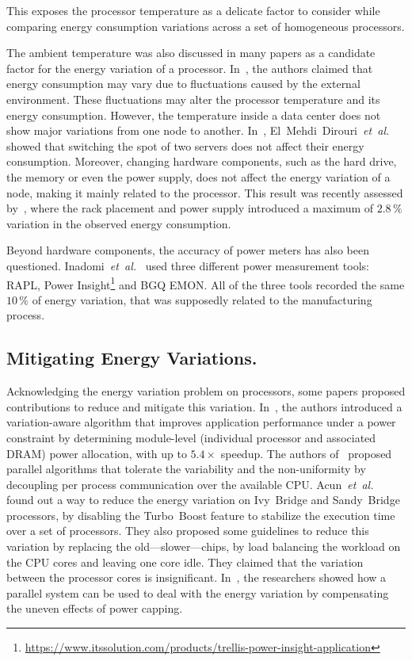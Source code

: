 
This exposes the processor temperature as a delicate factor to consider while comparing energy consumption variations across a set of homogeneous processors.%

The ambient temperature was also discussed in many papers as a candidate factor for the energy variation of a processor.
In~\cite{ranka_energy_2009}, the authors claimed that energy consumption may vary due to fluctuations caused by the external environment.
These fluctuations may alter the processor temperature and its energy consumption.
However, the temperature inside a data center does not show major variations from one node to another.
In~\cite{el_mehdi_diouri_your_2013}, El~Mehdi~Dirouri~\emph{et~al.} showed that switching the spot of two servers does not affect their energy consumption.
Moreover, changing hardware components, such as the hard drive, the memory or even the power supply, does not affect the energy variation of a node, making it mainly related to the processor.
This result was recently assessed by~\cite{wang_potential_2018}, where the rack placement and power supply introduced a maximum of $2.8\,\%$ variation in the observed energy consumption.

Beyond hardware components, the accuracy of power meters has also been questioned.
Inadomi~\emph{et~al.}~\cite{inadomi_analyzing_2015} used three different power measurement tools: RAPL, Power Insight\footnote{\url{https://www.itssolution.com/products/trellis-power-insight-application}} and BGQ EMON.
All of the three tools recorded the same $10\,\%$ of energy variation, that was supposedly related to the manufacturing process.

\subsection{Mitigating Energy Variations.}
Acknowledging the energy variation problem on processors, some papers proposed contributions to reduce and mitigate this variation.
In~\cite{inadomi_analyzing_2015}, the authors introduced a variation-aware algorithm that improves application performance under a power constraint by determining module-level (individual processor and associated DRAM) power allocation, with up to $5.4\times$ speedup.
The authors of~\cite{hammouda_noise-tolerant_2015} proposed parallel algorithms that tolerate the variability and the non-uniformity by decoupling per process communication over the available CPU.
Acun~\emph{et~al.}~\cite{acun_variation_2016} found out a way to reduce the energy variation on Ivy~Bridge and Sandy~Bridge processors, by disabling the Turbo~Boost feature to stabilize the execution time over a set of processors.
They also proposed some guidelines to reduce this variation by replacing the old---slower---chips, by load balancing the workload on the CPU cores and leaving one core idle.
They claimed that the variation between the processor cores is insignificant.
In~\cite{chasapis_runtime-guided_2016}, the researchers showed how a parallel system can be used to deal with the energy variation by compensating the uneven effects of power capping.

